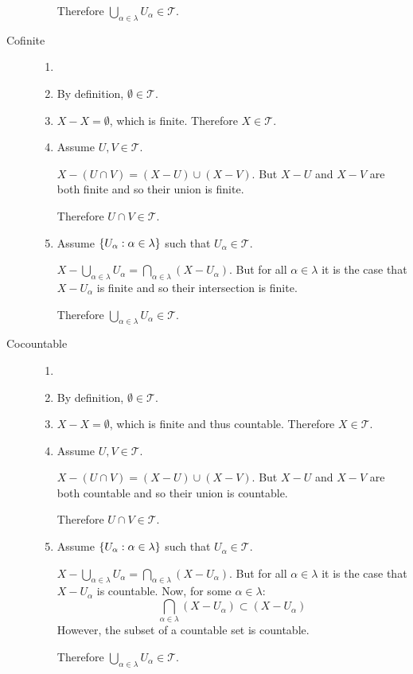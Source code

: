 \documentclass[letterpaper,12pt,fleqn]{article}
\newcommand{\T}{\mathscr{T}}
\renewcommand{\a}{\alpha}
\renewcommand{\l}{\lambda}
\begin{document}
\begin{example}[Exercise 2.5]
\begin{description}
\begin{enumerate}
      Therefore \(\bigcup_{\a\in\l}U_{\a}\in\T\).
    \end{enumerate}

  \item[Cofinite]
    \begin{enumerate}
    \item[]
    \item By definition, \(\emptyset\in\T\).

    \item \(X-X=\emptyset\), which is finite.  Therefore \(X\in\T\).

    \item Assume \(U,V\in\T\).

      \(X-(U\cap V)=(X-U)\cup(X-V)\).  But \(X-U\) and \(X-V\) are both finite and so their union is finite.

      Therefore \(U\cap V\in\T\).

    \item Assume \(\set{U_{\a}:\a\in\l}\) such that \(U_{\a}\in\T\).

      \(X-\bigcup_{\a\in\l}U_{\a}=\bigcap_{\a\in\l}(X-U_{\a})\).  But for all \(\a\in\l\) it is the case that
      \(X-U_{\a}\) is finite and so their intersection is finite.

      Therefore \(\bigcup_{\a\in\l}U_{\a}\in\T\).
    \end{enumerate}

  \item[Cocountable]
    \begin{enumerate}
    \item[]
    \item By definition, \(\emptyset\in\T\).

    \item \(X-X=\emptyset\), which is finite and thus countable.  Therefore \(X\in\T\).

    \item Assume \(U,V\in\T\).

      \(X-(U\cap V)=(X-U)\cup(X-V)\).  But \(X-U\) and \(X-V\) are both countable and so their union is countable.

      Therefore \(U\cap V\in\T\).

    \item Assume \(\set{U_{\a}:\a\in\l}\) such that \(U_{\a}\in\T\).

      \(X-\bigcup_{\a\in\l}U_{\a}=\bigcap_{\a\in\l}(X-U_{\a})\).  But for all \(\a\in\l\) it is the case that
      \(X-U_{\a}\) is countable.  Now, for some \(\a\in\l\):
      \[\bigcap_{\a\in\l}(X-U_{\a})\subset(X-U_{\a})\]
      However, the subset of a countable set is countable.

      Therefore \(\bigcup_{\a\in\l}U_{\a}\in\T\).
    \end{enumerate}
  \end{description}
\end{example}
\end{document}
